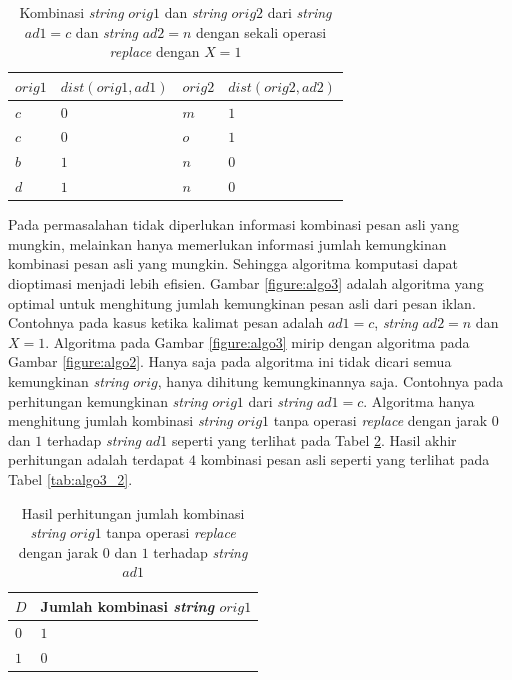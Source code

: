 \documentclass[a4paper]{IEEEtran}
\begin{document}
\begin{table}
	\centering
	\begin{tabular} {|p{1cm}|p{2.5cm}|p{1cm}|p{2.5cm}|} \hline
		$ orig1 $ & $ dist(orig1, ad1) $ & $ orig2 $ & $ dist(orig2, ad2) $ \\ \hline
		$ c $ & $ 0 $ & $ m $ & $ 1 $ \\ \hline		
		$ c $ & $ 0 $ & $ o $ & $ 1 $ \\ \hline
		$ b $ & $ 1 $ & $ n $ & $ 0 $ \\ \hline
		$ d $ & $ 1 $ & $ n $ & $ 0 $ \\ \hline
	\end{tabular}\caption{Kombinasi \textit{string} $ orig1 $ dan \textit{string} $ orig2 $ dari \textit{string} $ ad1=c $ dan \textit{string} $ ad2= n$ dengan sekali operasi \textit{replace} dengan $ X=1$} 
	\label{tab:algo2}
\end{table}


Pada permasalahan tidak diperlukan informasi kombinasi pesan asli yang mungkin, melainkan hanya memerlukan informasi jumlah kemungkinan kombinasi pesan asli yang mungkin. Sehingga algoritma komputasi dapat dioptimasi menjadi lebih efisien. Gambar \ref{figure:algo3} adalah algoritma yang optimal untuk menghitung jumlah kemungkinan pesan asli dari pesan iklan. Contohnya pada kasus ketika kalimat pesan adalah $ ad1=c $, \textit{string} $ ad2=n $ dan $ X=1 $. Algoritma pada Gambar \ref{figure:algo3} mirip dengan algoritma pada Gambar \ref{figure:algo2}. Hanya saja pada algoritma ini tidak dicari semua kemungkinan \textit{string} $ orig $, hanya dihitung kemungkinannya saja. Contohnya pada perhitungan kemungkinan \textit{string} $ orig1 $ dari \textit{string} $ ad1=c $. Algoritma hanya menghitung jumlah kombinasi \textit{string} $ orig1 $ tanpa operasi \textit{replace} dengan jarak $ 0 $ dan $ 1 $ terhadap \textit{string} $ ad1 $ seperti yang terlihat pada Tabel \ref{tab:algo3_1}. Hasil akhir perhitungan adalah terdapat $ 4 $ kombinasi pesan asli seperti yang terlihat pada Tabel \ref{tab:algo3_2}.

\begin{table}
	\centering
	\begin{tabular} {|p{2cm}|p{3cm}|} \hline
		$ D $ & Jumlah kombinasi \textit{string} $ orig1 $\\ \hline
		$ 0 $ & $ 1 $ \\ \hline		
		$ 1 $ & $ 0 $ \\ \hline
	\end{tabular}\caption{Hasil perhitungan jumlah kombinasi \textit{string} $ orig1 $ tanpa operasi \textit{replace} dengan jarak $ 0 $ dan $ 1 $ terhadap \textit{string} $ ad1 $} 
	\label{tab:algo3_1}
\end{table}
\end{document}

